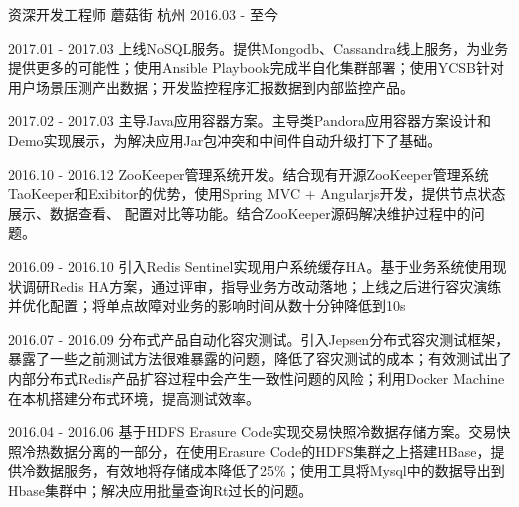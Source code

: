 

\begin{cventries}

  \cventry
    {资深开发工程师} %
    {蘑菇街} %
    {杭州} %
    {2016.03 - 至今} %
    {
      \begin{cvitems} %
        \item {2017.01 - 2017.03 上线NoSQL服务。提供Mongodb、Cassandra线上服务，为业务提供更多的可能性；使用Ansible Playbook完成半自化集群部署；使用YCSB针对用户场景压测产出数据；开发监控程序汇报数据到内部监控产品。}
        \item {2017.02 - 2017.03 主导Java应用容器方案。主导类Pandora应用容器方案设计和Demo实现展示，为解决应用Jar包冲突和中间件自动升级打下了基础。}
        \item {2016.10 - 2016.12 ZooKeeper管理系统开发。结合现有开源ZooKeeper管理系统TaoKeeper和Exibitor的优势，使用Spring MVC + Angularjs开发，提供节点状态展示、数据查看、 配置对比等功能。结合ZooKeeper源码解决维护过程中的问题。}
        \item {2016.09 - 2016.10 引入Redis Sentinel实现用户系统缓存HA。基于业务系统使用现状调研Redis HA方案，通过评审，指导业务方改动落地；上线之后进行容灾演练并优化配置；将单点故障对业务的影响时间从数十分钟降低到10s}
        \item {2016.07 - 2016.09 分布式产品自动化容灾测试。引入Jepsen分布式容灾测试框架，暴露了一些之前测试方法很难暴露的问题，降低了容灾测试的成本；有效测试出了内部分布式Redis产品扩容过程中会产生一致性问题的风险；利用Docker Machine在本机搭建分布式环境，提高测试效率。}
        \item {2016.04 - 2016.06 基于HDFS Erasure Code实现交易快照冷数据存储方案。交易快照冷热数据分离的一部分，在使用Erasure Code的HDFS集群之上搭建HBase，提供冷数据服务，有效地将存储成本降低了25\%；使用工具将Mysql中的数据导出到Hbase集群中；解决应用批量查询Rt过长的问题。}
      \end{cvitems}
    }


\end{cventries}
